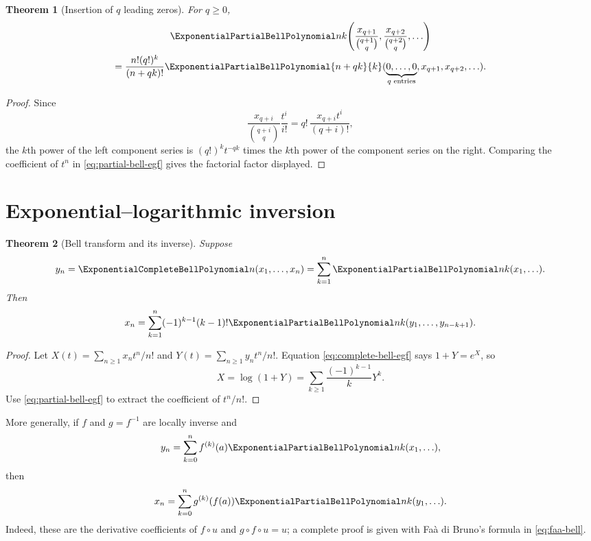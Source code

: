 \documentclass[11pt,a4paper,oneside,openany]{book}
\newtheorem{theorem}{Theorem}[chapter]
\theoremstyle{definition}
\theoremstyle{remark}
\begin{document}
\begin{theorem}[Insertion of $q$ leading zeros]\label{thm:bell-leading-zeros}
For $q\ge0$,
\begin{multline}\label{eq:bell-leading-zeros}
 \ExponentialPartialBellPolynomial nk\!\left(
 \frac{x_{q+1}}{\binom{q+1}{q}},
 \frac{x_{q+2}}{\binom{q+2}{q}},\ldots\right)\\
 =\frac{n!(q!)^k}{(n+qk)!}
 \ExponentialPartialBellPolynomial{n+qk}{k}(\underbrace{0,\ldots,0}_{q\text{ entries}},
 x_{q+1},x_{q+2},\ldots).
\end{multline}
\end{theorem}
\begin{proof}
Since
\[
 \frac{x_{q+i}}{\binom{q+i}{q}}\frac{t^i}{i!}
 =q!\,\frac{x_{q+i}t^i}{(q+i)!},
\]
the $k$th power of the left component series is $(q!)^k t^{-qk}$ times the
$k$th power of the component series on the right.  Comparing the coefficient of
$t^n$ in \eqref{eq:partial-bell-egf} gives the factorial factor displayed.
\end{proof}

\section{Exponential--logarithmic inversion}
\begin{theorem}[Bell transform and its inverse]\label{thm:bell-transform-inverse}
Suppose
\begin{equation}\label{eq:bell-transform-y}
 y_n=\ExponentialCompleteBellPolynomial n(x_1,\ldots,x_n)=\sum_{k=1}^{n}\ExponentialPartialBellPolynomial nk(x_1,\ldots).
\end{equation}
Then
\begin{equation}\label{eq:bell-transform-x}
 x_n=\sum_{k=1}^{n}(-1)^{k-1}(k-1)!
 \ExponentialPartialBellPolynomial nk(y_1,\ldots,y_{n-k+1}).
\end{equation}
\end{theorem}
\begin{proof}
Let $X(t)=\sum_{n\ge1}x_nt^n/n!$ and
$Y(t)=\sum_{n\ge1}y_nt^n/n!$.  Equation
\eqref{eq:complete-bell-egf} says $1+Y=e^X$, so
\[
 X=\log(1+Y)=\sum_{k\ge1}\frac{(-1)^{k-1}}{k}Y^k.
\]
Use \eqref{eq:partial-bell-egf} to extract the coefficient of $t^n/n!$.
\end{proof}

More generally, if $f$ and $g=f^{-1}$ are locally inverse and
\begin{equation}\label{eq:general-bell-transform}
 y_n=\sum_{k=0}^{n}f^{(k)}(a)\ExponentialPartialBellPolynomial nk(x_1,\ldots),
\end{equation}
then
\begin{equation}\label{eq:general-bell-inverse}
 x_n=\sum_{k=0}^{n}g^{(k)}(f(a))\ExponentialPartialBellPolynomial nk(y_1,\ldots).
\end{equation}
Indeed, these are the derivative coefficients of $f\circ u$ and
$g\circ f\circ u=u$; a complete proof is given with Fa\`a di Bruno's formula in
\cref{eq:faa-bell}.
\end{document}
